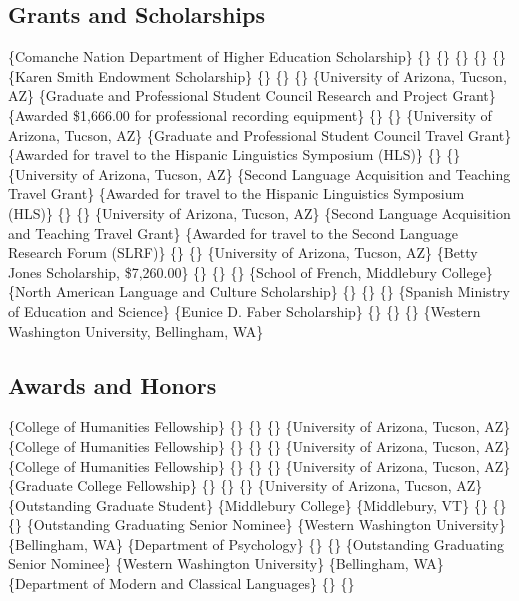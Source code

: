 \documentclass[11pt,letterpaper]{assets/tex/moderncv}
\begin{document}
\vspace{-0.2in}

\subsection{Grants and Scholarships}


\{Comanche Nation Department of Higher Education Scholarship\} \{\} \{\}
\{\} \{\} \{\}  \{Karen Smith Endowment Scholarship\} \{\}
\{\} \{\} \{University of Arizona, Tucson, AZ\} 
\{Graduate and Professional Student Council Research and Project Grant\}
\{\newline Awarded \$1,666.00 for professional recording equipment\}
\{\} \{\} \{University of Arizona, Tucson, AZ\} 
\{Graduate and Professional Student Council Travel Grant\}
\{\newline Awarded for travel to the Hispanic Linguistics Symposium
(HLS)\} \{\} \{\} \{University of Arizona, Tucson, AZ\} 
\{Second Language Acquisition and Teaching Travel Grant\}
\{\newline Awarded for travel to the Hispanic Linguistics Symposium
(HLS)\} \{\} \{\} \{University of Arizona, Tucson, AZ\} 
\{Second Language Acquisition and Teaching Travel Grant\}
\{\newline Awarded for travel to the Second Language Research Forum
(SLRF)\} \{\} \{\} \{University of Arizona, Tucson, AZ\} 
\{Betty Jones Scholarship, \$7,260.00\} \{\} \{\} \{\} \{School of
French, Middlebury College\}  \{North American
Language and Culture Scholarship\} \{\} \{\} \{\} \{Spanish Ministry of
Education and Science\}  \{Eunice D. Faber
Scholarship\} \{\} \{\} \{\} \{Western Washington University,
Bellingham, WA\}

\subsection{Awards and Honors}


\{College of Humanities Fellowship\} \{\} \{\} \{\} \{University of
Arizona, Tucson, AZ\}  \{College of Humanities
Fellowship\} \{\} \{\} \{\} \{University of Arizona, Tucson, AZ\}
 \{College of Humanities Fellowship\} \{\} \{\}
\{\} \{University of Arizona, Tucson, AZ\} 
\{Graduate College Fellowship\} \{\} \{\} \{\} \{University of Arizona,
Tucson, AZ\}  \{Outstanding Graduate Student\}
\{Middlebury College\} \{Middlebury, VT\} \{\} \{\} \{\} 
\{Outstanding Graduating Senior Nominee\} \{Western Washington
University\} \{Bellingham, WA\} \{Department of Psychology\} \{\} \{\}
 \{Outstanding Graduating Senior Nominee\} \{Western
Washington University\} \{Bellingham, WA\} \{Department of Modern and
Classical Languages\} \{\} \{\}
\end{document}

